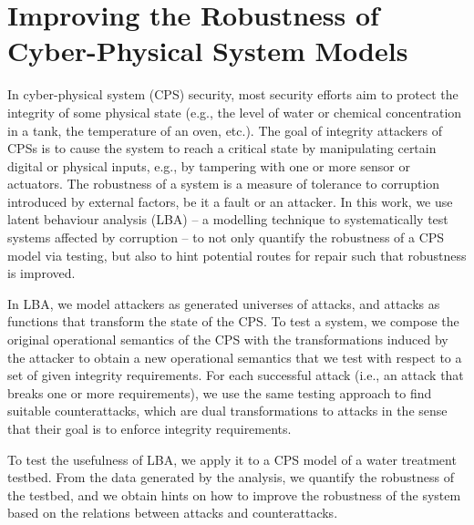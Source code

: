  \chapter{Improving the Robustness of Cyber-Physical System Models}
 \label{ch:CPSRobustness} 
   In cyber-physical system (CPS) security, most security efforts aim to protect the integrity of some physical state (e.g., the level of water or chemical concentration in a tank, the temperature of an oven, etc.). The goal of integrity attackers of CPSs is to cause the system to reach a critical state by manipulating certain digital or physical inputs, e.g., by tampering with one or more sensor or actuators. The robustness of a system is a measure of tolerance to corruption introduced by external factors, be it a fault or an attacker. In this work, we use latent behaviour analysis (LBA) -- a modelling technique to systematically test systems affected by corruption -- to not only quantify the robustness of a CPS model via testing, but also to hint potential routes for repair such that robustness is improved. 
   
   In LBA, we model attackers as generated universes of attacks, and attacks as functions that transform the state of the CPS. To test a system, we compose the original operational semantics of the CPS with the transformations induced by the attacker to obtain a new operational semantics that we test with respect to a set of given integrity requirements. For each successful attack (i.e., an attack that breaks one or more requirements), we use the same testing approach to find suitable counterattacks, which are dual transformations to attacks in the sense that their goal is to enforce integrity requirements. 
   
   To test the usefulness of LBA, we apply it to a CPS model of a water treatment testbed. From the data generated by the analysis, we quantify the robustness of the testbed, and we obtain hints on how to improve the robustness of the system based on the relations between attacks and counterattacks.
